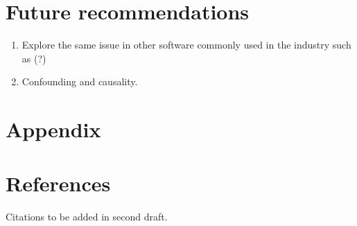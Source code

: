 \documentclass[12pt]{article}
\begin{document}
	\section{Future recommendations}
	\begin{enumerate}
		\item Explore the same issue in other software commonly used in the industry such as (?)
		\item Confounding and causality.
	\end{enumerate}
	\section{Appendix}
	
	\section{References}
	Citations to be added in second draft.
	
\end{document}
